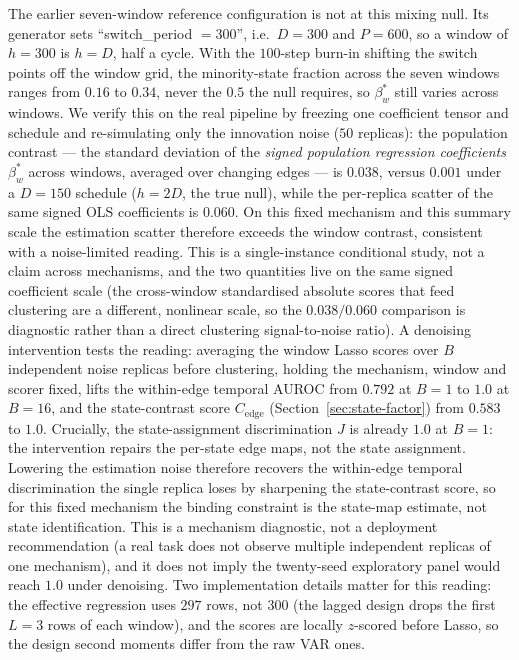 \documentclass[11pt]{article}
\begin{document}
The earlier seven-window reference configuration is not at this mixing null.
Its generator sets
``switch\_period $=300$'', i.e.\ $D=300$ and $P=600$, so a window of $h=300$ is
$h=D$, half a cycle. With the $100$-step burn-in shifting the switch points off
the window grid, the minority-state fraction across the seven windows ranges
from $0.16$ to $0.34$, never the $0.5$ the null requires, so $\beta_w^{*}$ still
varies across windows. We verify this on the real pipeline by freezing one
coefficient tensor and schedule and re-simulating only the innovation noise
($50$ replicas): the population contrast --- the standard deviation of the
\emph{signed population regression coefficients} $\beta_w^{*}$ across windows,
averaged over changing edges --- is $0.038$, versus $0.001$ under a $D{=}150$
schedule ($h{=}2D$, the true null), while the per-replica scatter of the same
signed OLS coefficients is $0.060$. On this fixed mechanism and this summary
scale the estimation scatter therefore exceeds the window contrast, consistent
with a noise-limited reading. This is a single-instance conditional study, not a
claim across mechanisms, and the two quantities live on the same signed
coefficient scale (the cross-window standardised absolute scores that feed
clustering are a different, nonlinear scale, so the $0.038/0.060$ comparison is
diagnostic rather than a direct clustering signal-to-noise ratio). A denoising
intervention tests the reading: averaging the window Lasso scores over $B$
independent noise replicas before clustering, holding the mechanism, window and
scorer fixed, lifts the within-edge temporal AUROC from $0.792$ at $B{=}1$ to
$1.0$ at $B{=}16$, and the state-contrast score $C_{\mathrm{edge}}$
(Section~\ref{sec:state-factor}) from $0.583$ to $1.0$. Crucially, the state-assignment
discrimination $J$ is already $1.0$ at $B{=}1$: the intervention repairs the
per-state edge maps, not the state assignment. Lowering the estimation noise
therefore recovers the within-edge temporal discrimination the single replica loses by sharpening
the state-contrast score, so for this fixed mechanism the binding constraint is
the state-map estimate, not state identification. This is a mechanism diagnostic,
not a deployment recommendation (a real task does not observe multiple
independent replicas of one mechanism), and it does not imply the twenty-seed
exploratory panel would reach $1.0$ under denoising. Two implementation details matter
for this reading: the effective regression uses $297$ rows, not $300$ (the lagged
design drops the first $L{=}3$ rows of each window), and the scores are locally
$z$-scored before Lasso, so the design second moments differ from the raw VAR
ones.
\end{document}
